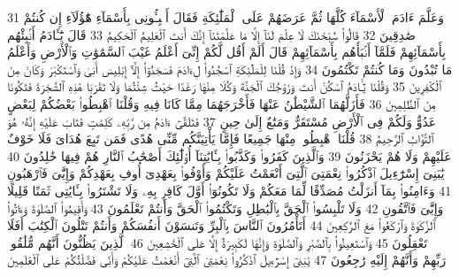 {\tiny\colorbox{cl_aya}{31}} وَعَلَّمَ ءَادَمَ ٱلْأَسْمَآءَ كُلَّهَا ثُمَّ عَرَضَهُمْ عَلَى ٱلْمَلَٰٓئِكَةِ فَقَالَ أَنۢبِـُٔونِى بِأَسْمَآءِ هَٰٓؤُلَآءِ إِن كُنتُمْ صَٰدِقِينَ
{\tiny\colorbox{cl_aya}{32}} قَالُوا۟ سُبْحَٰنَكَ لَا عِلْمَ لَنَآ إِلَّا مَا عَلَّمْتَنَآ إِنَّكَ أَنتَ ٱلْعَلِيمُ ٱلْحَكِيمُ
{\tiny\colorbox{cl_aya}{33}} قَالَ يَٰٓـَٔادَمُ أَنۢبِئْهُم بِأَسْمَآئِهِمْ فَلَمَّآ أَنۢبَأَهُم بِأَسْمَآئِهِمْ قَالَ أَلَمْ أَقُل لَّكُمْ إِنِّىٓ أَعْلَمُ غَيْبَ ٱلسَّمَٰوَٰتِ وَٱلْأَرْضِ وَأَعْلَمُ مَا تُبْدُونَ وَمَا كُنتُمْ تَكْتُمُونَ
{\tiny\colorbox{cl_aya}{34}} وَإِذْ قُلْنَا لِلْمَلَٰٓئِكَةِ ٱسْجُدُوا۟ لِءَادَمَ فَسَجَدُوٓا۟ إِلَّآ إِبْلِيسَ أَبَىٰ وَٱسْتَكْبَرَ وَكَانَ مِنَ ٱلْكَٰفِرِينَ
{\tiny\colorbox{cl_aya}{35}} وَقُلْنَا يَٰٓـَٔادَمُ ٱسْكُنْ أَنتَ وَزَوْجُكَ ٱلْجَنَّةَ وَكُلَا مِنْهَا رَغَدًا حَيْثُ شِئْتُمَا وَلَا تَقْرَبَا هَٰذِهِ ٱلشَّجَرَةَ فَتَكُونَا مِنَ ٱلظَّٰلِمِينَ
{\tiny\colorbox{cl_aya}{36}} فَأَزَلَّهُمَا ٱلشَّيْطَٰنُ عَنْهَا فَأَخْرَجَهُمَا مِمَّا كَانَا فِيهِ وَقُلْنَا ٱهْبِطُوا۟ بَعْضُكُمْ لِبَعْضٍ عَدُوٌّ وَلَكُمْ فِى ٱلْأَرْضِ مُسْتَقَرٌّ وَمَتَٰعٌ إِلَىٰ حِينٍ
{\tiny\colorbox{cl_aya}{37}} فَتَلَقَّىٰٓ ءَادَمُ مِن رَّبِّهِۦ كَلِمَٰتٍ فَتَابَ عَلَيْهِ إِنَّهُۥ هُوَ ٱلتَّوَّابُ ٱلرَّحِيمُ
{\tiny\colorbox{cl_aya}{38}} قُلْنَا ٱهْبِطُوا۟ مِنْهَا جَمِيعًا فَإِمَّا يَأْتِيَنَّكُم مِّنِّى هُدًى فَمَن تَبِعَ هُدَاىَ فَلَا خَوْفٌ عَلَيْهِمْ وَلَا هُمْ يَحْزَنُونَ
{\tiny\colorbox{cl_aya}{39}} وَٱلَّذِينَ كَفَرُوا۟ وَكَذَّبُوا۟ بِـَٔايَٰتِنَآ أُو۟لَٰٓئِكَ أَصْحَٰبُ ٱلنَّارِ هُمْ فِيهَا خَٰلِدُونَ
{\tiny\colorbox{cl_aya}{40}} يَٰبَنِىٓ إِسْرَٰٓءِيلَ ٱذْكُرُوا۟ نِعْمَتِىَ ٱلَّتِىٓ أَنْعَمْتُ عَلَيْكُمْ وَأَوْفُوا۟ بِعَهْدِىٓ أُوفِ بِعَهْدِكُمْ وَإِيَّٰىَ فَٱرْهَبُونِ
{\tiny\colorbox{cl_aya}{41}} وَءَامِنُوا۟ بِمَآ أَنزَلْتُ مُصَدِّقًا لِّمَا مَعَكُمْ وَلَا تَكُونُوٓا۟ أَوَّلَ كَافِرٍۭ بِهِۦ وَلَا تَشْتَرُوا۟ بِـَٔايَٰتِى ثَمَنًا قَلِيلًا وَإِيَّٰىَ فَٱتَّقُونِ
{\tiny\colorbox{cl_aya}{42}} وَلَا تَلْبِسُوا۟ ٱلْحَقَّ بِٱلْبَٰطِلِ وَتَكْتُمُوا۟ ٱلْحَقَّ وَأَنتُمْ تَعْلَمُونَ
{\tiny\colorbox{cl_aya}{43}} وَأَقِيمُوا۟ ٱلصَّلَوٰةَ وَءَاتُوا۟ ٱلزَّكَوٰةَ وَٱرْكَعُوا۟ مَعَ ٱلرَّٰكِعِينَ
{\tiny\colorbox{cl_aya}{44}} أَتَأْمُرُونَ ٱلنَّاسَ بِٱلْبِرِّ وَتَنسَوْنَ أَنفُسَكُمْ وَأَنتُمْ تَتْلُونَ ٱلْكِتَٰبَ أَفَلَا تَعْقِلُونَ
{\tiny\colorbox{cl_aya}{45}} وَٱسْتَعِينُوا۟ بِٱلصَّبْرِ وَٱلصَّلَوٰةِ وَإِنَّهَا لَكَبِيرَةٌ إِلَّا عَلَى ٱلْخَٰشِعِينَ
{\tiny\colorbox{cl_aya}{46}} ٱلَّذِينَ يَظُنُّونَ أَنَّهُم مُّلَٰقُوا۟ رَبِّهِمْ وَأَنَّهُمْ إِلَيْهِ رَٰجِعُونَ
{\tiny\colorbox{cl_aya}{47}} يَٰبَنِىٓ إِسْرَٰٓءِيلَ ٱذْكُرُوا۟ نِعْمَتِىَ ٱلَّتِىٓ أَنْعَمْتُ عَلَيْكُمْ وَأَنِّى فَضَّلْتُكُمْ عَلَى ٱلْعَٰلَمِينَ
